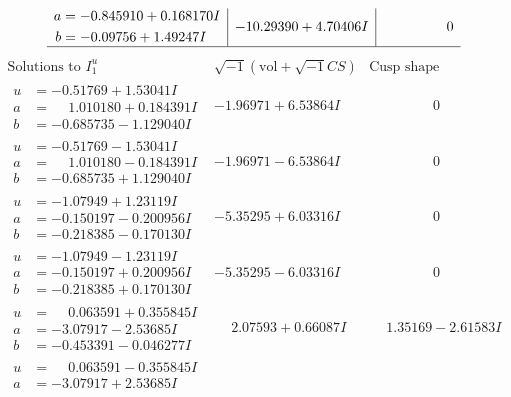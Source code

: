 \documentclass[1p]{elsarticle_modified}
\theoremstyle{definition}
\newcommand{\I}{\sqrt{-1}}
\begin{document}
$$\begin{array}{c|c|c}
\begin{aligned}
a &= -0.845910 + 0.168170 I \\
b &= -0.09756 + 1.49247 I\end{aligned}
 & -10.29390 + 4.70406 I & \phantom{-0.000000 } 0\\
 \hline 
 \end{array}$$\newpage$$\begin{array}{c|c|c}  
\text{Solutions to }I^u_{1}& \I (\text{vol} + \sqrt{-1}CS) & \text{Cusp shape}\\
 \hline 
\begin{aligned}
u &= -0.51769 + 1.53041 I \\
a &= \phantom{-}1.010180 + 0.184391 I \\
b &= -0.685735 - 1.129040 I\end{aligned}
 & -1.96971 + 6.53864 I & \phantom{-0.000000 } 0 \\ \hline\begin{aligned}
u &= -0.51769 - 1.53041 I \\
a &= \phantom{-}1.010180 - 0.184391 I \\
b &= -0.685735 + 1.129040 I\end{aligned}
 & -1.96971 - 6.53864 I & \phantom{-0.000000 } 0 \\ \hline\begin{aligned}
u &= -1.07949 + 1.23119 I \\
a &= -0.150197 - 0.200956 I \\
b &= -0.218385 - 0.170130 I\end{aligned}
 & -5.35295 + 6.03316 I & \phantom{-0.000000 } 0 \\ \hline\begin{aligned}
u &= -1.07949 - 1.23119 I \\
a &= -0.150197 + 0.200956 I \\
b &= -0.218385 + 0.170130 I\end{aligned}
 & -5.35295 - 6.03316 I & \phantom{-0.000000 } 0 \\ \hline\begin{aligned}
u &= \phantom{-}0.063591 + 0.355845 I \\
a &= -3.07917 - 2.53685 I \\
b &= -0.453391 - 0.046277 I\end{aligned}
 & \phantom{-}2.07593 + 0.66087 I & \phantom{-}1.35169 - 2.61583 I \\ \hline\begin{aligned}
u &= \phantom{-}0.063591 - 0.355845 I \\
a &= -3.07917 + 2.53685 I \\

\end{aligned}
\end{array}$$
\end{document}

